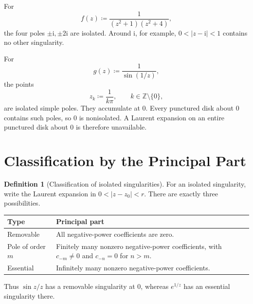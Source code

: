 \documentclass[11pt,a4paper]{article}
\theoremstyle{definition}
\newtheorem{definition}{Definition}
\theoremstyle{plain}
\begin{document}
For
\begin{equation}\label{eq:20}
f(z)\coloneqq\frac1{(z^2+1)(z^2+4)},
\end{equation}
the four poles $\pm \mathrm{i},\pm2\mathrm{i}$ are isolated. Around $\mathrm{i}$, for example,
$0<|z-\mathrm{i}|<1$ contains no other singularity.

For
\begin{equation}\label{eq:21}
g(z)\coloneqq\frac1{\sin(1/z)},
\end{equation}
the points
\begin{equation}\label{eq:22}
z_k\coloneqq \frac1{k\pi},\qquad k\in\mathbb Z\setminus\{0\},
\end{equation}
are isolated simple poles. They accumulate at $0$. Every punctured disk
about $0$ contains such poles, so $0$ is nonisolated. A Laurent expansion
on an entire punctured disk about $0$ is therefore unavailable.

\section{Classification by the Principal Part}
\begin{definition}[Classification of isolated singularities]
For an isolated singularity, write the Laurent expansion in
$0<|z-z_0|<r$. There are exactly three possibilities.
\begin{center}
\begin{tabular}{@{}p{.24\linewidth}p{.66\linewidth}@{}}
\toprule
Type & Principal part\\ \midrule
Removable & All negative-power coefficients are zero.\\[3pt]
Pole of order $m$ & Finitely many nonzero negative-power coefficients,
with $c_{-m}\neq0$ and $c_{-n}=0$ for $n>m$.\\[3pt]
Essential & Infinitely many nonzero negative-power coefficients.\\
\bottomrule
\end{tabular}
\end{center}
\end{definition}

Thus $\sin z/z$ has a removable singularity at $0$, whereas $e^{1/z}$
has an essential singularity there.
\end{document}

